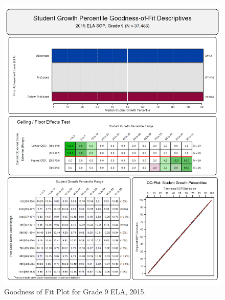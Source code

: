 \documentclass[12pt]{article}
\begin{document}
\begin{figure}[htbp]
\centering
\includegraphics{../img/Goodness_of_Fit/ELA.2015/2015_ELA_9;2014_ELA_8;2013_ELA_7;2012_ELA_6;2011_ELA_5;2010_ELA_4.png}
\caption{Goodness of Fit Plot for Grade 9 ELA, 2015.}
\end{figure}
\end{document}
